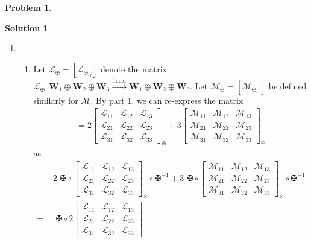 \documentclass{book}
\theoremstyle{definition}
\newtheorem*{prob*}{Problem}
\newtheorem*{sln*}{Solution}
\newcommand{\W}{\mathbf{W}}
\newcommand{\lag}{\mathcal{L}}
\newcommand{\M}{\mathcal{M}}
\newcommand{\lin}{\overset{\text{linear}}{\longrightarrow}}
\begin{document}
\begin{prob*}
\begin{sln*}
\begin{enumerate}
						
						
						
						
						
						
		
			\newpage
			
			
			

			
			
			\item 
			\begin{enumerate}
				\item Let $\lag_\oplus = [\lag_{\oplus_{ij}}]$ denote the matrix $\lag_\oplus : \W_1\oplus\W_2\oplus\W_3\lin\W_1\oplus\W_2\oplus\W_3$. Let $\M_\oplus = [\M_{\oplus_{ij}}]$ be defined similarly for $\M$. By part 1, we can re-express the matrix 
				\begin{align*}
				[(2\lag_\oplus + 3\M_\oplus)_{ij}] = 2\begin{bmatrix}
				\lag_{11} & \lag_{12} & \lag_{13}\\
				\lag_{21} & \lag_{22} & \lag_{23}\\
				\lag_{31} & \lag_{32} & \lag_{33}
				\end{bmatrix}_\oplus
				+ 
				3\begin{bmatrix}
				\M_{11} & \M_{12} & \M_{13}\\
				\M_{21} & \M_{22} & \M_{23}\\
				\M_{31} & \M_{32} & \M_{33}
				\end{bmatrix}_\oplus 
				\end{align*}
				as 
				\begin{align*}
				&2\,\,\maltese \circ \begin{bmatrix}
				\lag_{11} & \lag_{12} & \lag_{13}\\
				\lag_{21} & \lag_{22} & \lag_{23}\\
				\lag_{31} & \lag_{32} & \lag_{33}
				\end{bmatrix}_\times \circ \maltese^{-1}
				+ 
				3\,\,\maltese\circ\begin{bmatrix}
				\M_{11} & \M_{12} & \M_{13}\\
				\M_{21} & \M_{22} & \M_{23}\\
				\M_{31} & \M_{32} & \M_{33}
				\end{bmatrix}_\times \circ \maltese^{-1} \\
				=\,\,
				&\,\,\maltese \circ 2\begin{bmatrix}
				\lag_{11} & \lag_{12} & \lag_{13}\\
				\lag_{21} & \lag_{22} & \lag_{23}\\
				\lag_{31} & \lag_{32} & \lag_{33}

\end{bmatrix}
\end{align*}
\end{enumerate}
\end{enumerate}
\end{sln*}
\end{prob*}
\end{document}
